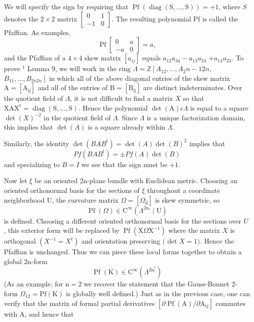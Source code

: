 \documentclass[10pt]{article}
\begin{document}
We will specify the sign by requiring that $\operatorname{Pf}(\operatorname{diag}(\mathrm{S}, \ldots, \mathrm{S}))=+1$, where $S$ denotes the $2 \times 2$ matrix $\left[\begin{array}{rr}0 & 1 \\ -1 & 0\end{array}\right]$. The resulting polynomial Pf is called the Pfaffian. As examples,
$$
\operatorname{Pf}\left[\begin{array}{rr}
0 & a \\
-a & 0
\end{array}\right]=a,
$$
and the Pfaffian of a $4 \times 4$ skew matrix $\left[a_{i j}\right]$ equals $a_{12} a_{34}-a_{13} a_{24}$ $+a_{14} a_{23}$. To prove ${ }^{1}$ Lemma 9, we will work in the ring $\Lambda=\mathbb{Z}\left[A_{12}, \ldots, A_{2} n-12 n\right.$, $\left.B_{11}, \ldots, B_{2 n 2 n}\right]$ in which all of the above diagonal entries of the skew matrix $\mathrm{A}=\left[\mathrm{A}_{\mathrm{ij}}\right]$ and all of the entries of $\mathrm{B}=\left[\mathrm{B}_{\mathrm{ij}}\right]$ are distinct indeterminates. Over the quotient field of $\Lambda$, it is not difficult to find a matrix $X$ so that $\mathrm{XAX}^{\mathrm{t}}=\operatorname{diag}(\mathrm{S}, \ldots, \mathrm{S})$. Hence the polynomial $\operatorname{det}(\mathrm{A}) \epsilon \Lambda$ is equal to a square $\operatorname{det}(X)^{-2}$ in the quotient field of $\Lambda$. Since $\Lambda$ is a unique factorization domain, this implies that $\operatorname{det}(A)$ is a square already within $\Lambda$.

Similarly, the identity $\operatorname{det}\left(B A B^{t}\right)=\operatorname{det}(A) \operatorname{det}(B)^{2}$ implies that
$$
P f\left(B A B^{t}\right)=\pm P f(A) \operatorname{det}(B)
$$
and specializing to $B=I$ we see that the sign must be $+1$.

Now let $\xi$ be an oriented 2n-plane bundle with Euclidean metric. Choosing an oriented orthonormal basis for the sections of $\xi$ throughout a coordinate neighborhood $\mathrm{U}$, the curvature matrix $\Omega=\left[\Omega_{\mathrm{ij}}\right]$ is skew symmetric, so
$$
\operatorname{Pf}(\Omega) \in \mathrm{C}^{\infty}\left(\Lambda^{2 \mathrm{n}_{\tau}} \mid \mathrm{U}\right)
$$
is defined. Choosing a different oriented orthonormal basis for the sections over $U$, this exterior form will be replaced by $\operatorname{Pf}\left(\mathrm{X} \Omega \mathrm{X}^{-1}\right)$ where the matrix $X$ is orthogonal $\left(X^{-1}=X^{t}\right)$ and orientation preserving $($ det $X=1)$. Hence the Pfaffian is unchanged. Thus we can piece these local forms together to obtain a global $2 \mathrm{n}$-form
$$
\operatorname{Pf}(\mathrm{K}) \in \mathrm{C}^{\infty}\left(\Lambda^{2 \mathrm{n}_{\tau}^{*}}\right)
$$
(As an example, for $\mathrm{n}=2$ we recover the statement that the Gauss-Bonnet 2-form $\Omega_{12}=\mathrm{Pf}(\mathrm{K})$ is globally well defined.) Just as in the previous case, one can verify that the matrix of formal partial derivatives $\left[\partial \operatorname{Pf}(\mathrm{A}) / \partial \mathrm{A}_{\mathrm{i} j}\right]$ commutes with $\mathrm{A}$, and hence that
\end{document}
